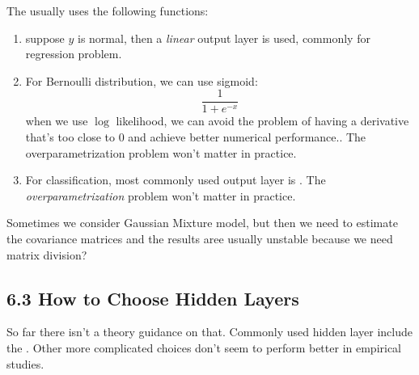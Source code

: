 \documentclass[12pt]{article}
\begin{document}
    The  usually uses the following functions:
    \begin{enumerate}
        \item suppose \(y\) is normal, then a \textit{linear} output layer is used, commonly for regression problem. 
        \item For Bernoulli distribution, we can use sigmoid:
        \begin{equation*}
            \frac{1}{1+ e^{-x}}
        \end{equation*}
        when we use \(\log\) likelihood, we can avoid the problem of having a derivative that's too close to \(0\) and achieve better numerical performance.. The overparametrization problem won't matter in practice.
        \item For classification, most commonly used output layer is . The \textit{overparametrization} problem won't matter in practice.
    \end{enumerate}
    
    Sometimes we consider Gaussian Mixture model, but then we need to estimate the covariance matrices and the results aree usually unstable because we need matrix division?

    \subsection{6.3 How to Choose Hidden Layers}
    So far there isn't a theory guidance on that. Commonly used hidden layer include the . Other more complicated choices don't seem to perform better in empirical studies. 
\end{document}
